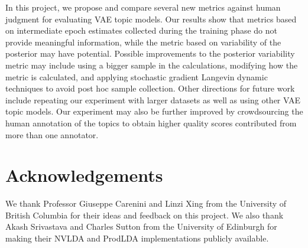 \documentclass[10pt]{article}
\begin{document}
In this project, we propose and compare several new metrics against human judgment for evaluating VAE topic models. Our results show that metrics based on intermediate epoch estimates collected during the training phase do not provide meaningful information, while the metric based on variability of the posterior may have potential. Possible improvements to the posterior variability metric may include using a bigger sample in the calculations, modifying how the metric is calculated, and applying stochastic gradient Langevin dynamic techniques to avoid post hoc sample collection. Other directions for future work include repeating our experiment with larger datasets as well as using other VAE topic models. Our experiment may also be further improved by crowdsourcing the human annotation of the topics to obtain higher quality scores contributed from more than one annotator.

\section*{Acknowledgements}

We thank Professor Giuseppe Carenini and Linzi Xing from the University of British Columbia for their ideas and feedback on this project. We also thank Akash Srivastava and Charles Sutton from the University of Edinburgh for making their NVLDA and ProdLDA implementations publicly available.

%
%
\end{document}
